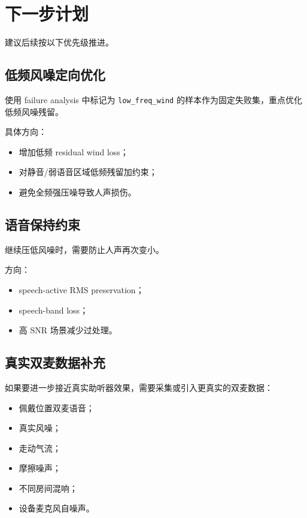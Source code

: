\documentclass[UTF8,12pt,a4paper]{ctexart}
\begin{document}
\section{下一步计划}

建议后续按以下优先级推进。

\subsection{低频风噪定向优化}

使用 failure analysis 中标记为 \texttt{low\_freq\_wind} 的样本作为固定失败集，重点优化低频风噪残留。

具体方向：

\begin{itemize}
  \item 增加低频 residual wind loss；
  \item 对静音/弱语音区域低频残留加约束；
  \item 避免全频强压噪导致人声损伤。
\end{itemize}

\subsection{语音保持约束}

继续压低风噪时，需要防止人声再次变小。

方向：

\begin{itemize}
  \item speech-active RMS preservation；
  \item speech-band loss；
  \item 高 SNR 场景减少过处理。
\end{itemize}

\subsection{真实双麦数据补充}

如果要进一步接近真实助听器效果，需要采集或引入更真实的双麦数据：

\begin{itemize}
  \item 佩戴位置双麦语音；
  \item 真实风噪；
  \item 走动气流；
  \item 摩擦噪声；
  \item 不同房间混响；
  \item 设备麦克风自噪声。
\end{itemize}
\end{document}
